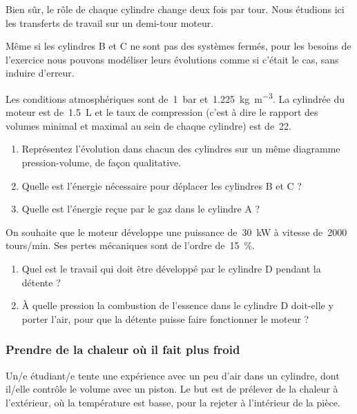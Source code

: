 		Bien sûr, le rôle de chaque cylindre change deux fois par tour. Nous étudions ici les transferts de travail sur un demi-tour moteur.

		Même si les cylindres B et C ne sont pas des systèmes fermés, pour les besoins de l’exercice nous pouvons modéliser leurs évolutions comme si c’était le cas, sans induire d’erreur.

		Les conditions atmosphériques sont de~\SI{1}{\bar} et~\SI{1,225}{\kilogram\per\metre\cubed}.	La cylindrée du moteur est de~\SI{1,5}{\liter} et le taux de compression (c’est à dire le rapport des volumes minimal et maximal au sein de chaque cylindre) est de~\num{22}.
		
		\begin{enumerate}
			\item Représentez l’évolution dans chacun des cylindres sur un même diagramme pression-volume, de façon qualitative.
			\item Quelle est l’énergie nécessaire pour déplacer les cylindres B et C ?
			\item Quelle est l’énergie reçue par le gaz dans le cylindre A ?
		\end{enumerate}
		
		On souhaite que le moteur développe une puissance de~\SI{30}{\kilo\watt} à vitesse de~\num{2000} \si{tours/min}. Ses pertes mécaniques sont de l’ordre de~\SI{15}{\percent}.
		
		\begin{enumerate}
			\item Quel est le travail qui doit être développé par le cylindre D pendant la détente ?
			\item À quelle pression la combustion de l’essence dans le cylindre D doit-elle y porter l’air, pour que la détente puisse faire fonctionner le moteur ?
		\end{enumerate}



\subsubsection{Prendre de la chaleur où il fait plus froid}
\label{exo_prendre_de_la_chaleur}

	Un/e étudiant/e tente une expérience avec un peu d’air dans un cylindre, dont il/elle contrôle le volume avec un piston. Le but est de prélever de la chaleur à l’extérieur, où la température est basse, pour la rejeter à l’intérieur de la pièce.

